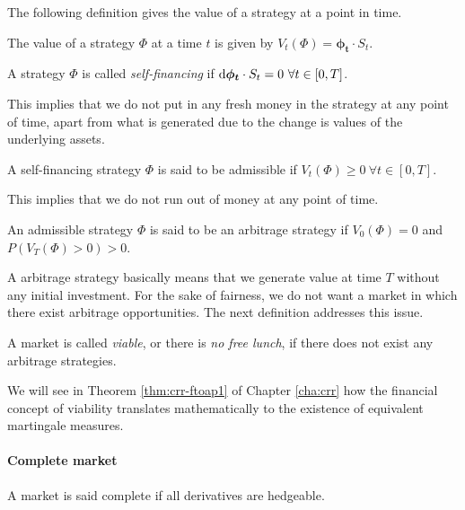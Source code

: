 The following definition gives the value of a strategy at a point in time.
\begin{dfn}
	The value of a strategy $ \Phi $ at a time $ t $ is given by $ V_t( \Phi ) = \bm{\phi_t} \cdot S_t $.
\end{dfn}

\begin{dfn}
	A strategy $ \Phi $ is called \emph{self-financing} if $ \dif \bm{\phi_t} \cdot S_t = 0 \  \forall t \in [0, T] $.
\end{dfn}
This implies that we do not put in any fresh money in the strategy at any point of time, apart from what is generated due to the change is values of the underlying assets.

\begin{dfn}
	A self-financing strategy $ \Phi $ is said to be admissible if $ V_t( \Phi ) \ge 0 \  \forall t \in [0, T] $.
\end{dfn}
This implies that we do not run out of money at any point of time.

\begin{dfn}
	An admissible strategy $ \Phi $ is said to be an arbitrage strategy if $ V_0( \Phi ) = 0 $ and $ P( V_T( \Phi ) > 0 ) > 0 $.
\end{dfn}
A arbitrage strategy basically means that we generate value at time $ T $ without any initial investment. For the sake of fairness, we do not want a market in which there exist arbitrage opportunities. The next definition addresses this issue.

\begin{dfn}
	A market is called \emph{viable}, or there is \emph{no free lunch}, if there does not exist any arbitrage strategies.
\end{dfn}

We will see in Theorem \ref{thm:crr-ftoap1} of Chapter \ref{cha:crr} how the financial concept of viability translates mathematically to the existence of equivalent martingale measures.


\paragraph{Complete market}

\begin{dfn}
	A market is said complete if all derivatives are hedgeable.
\end{dfn}

